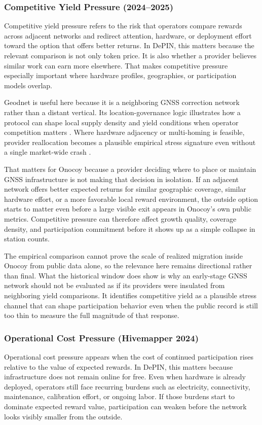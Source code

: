 \subsubsection*{Competitive Yield Pressure (2024--2025)}
Competitive yield pressure refers to the risk that operators compare rewards across adjacent networks and redirect attention, hardware, or deployment effort toward the option that offers better returns. In DePIN, this matters because the relevant comparison is not only token price. It is also whether a provider believes similar work can earn more elsewhere. That makes competitive pressure especially important where hardware profiles, geographies, or participation models overlap.

Geodnet is useful here because it is a neighboring GNSS correction network rather than a distant vertical. Its location-governance logic illustrates how a protocol can shape local supply density and yield conditions when operator competition matters \cite{GeodnetLocationNFT}. Where hardware adjacency or multi-homing is feasible, provider reallocation becomes a plausible empirical stress signature even without a single market-wide crash \cite{Lin2024, Chiu2024}.

That matters for Onocoy because a provider deciding where to place or maintain GNSS infrastructure is not making that decision in isolation. If an adjacent network offers better expected returns for similar geographic coverage, similar hardware effort, or a more favorable local reward environment, the outside option starts to matter even before a large visible exit appears in Onocoy's own public metrics. Competitive pressure can therefore affect growth quality, coverage density, and participation commitment before it shows up as a simple collapse in station counts.

The empirical comparison cannot prove the scale of realized migration inside Onocoy from public data alone, so the relevance here remains directional rather than final. What the historical window does show is why an early-stage GNSS network should not be evaluated as if its providers were insulated from neighboring yield comparisons. It identifies competitive yield as a plausible stress channel that can shape participation behavior even when the public record is still too thin to measure the full magnitude of that response.

\subsubsection*{Operational Cost Pressure (Hivemapper 2024)}
Operational cost pressure appears when the cost of continued participation rises relative to the value of expected rewards. In DePIN, this matters because infrastructure does not remain online for free. Even when hardware is already deployed, operators still face recurring burdens such as electricity, connectivity, maintenance, calibration effort, or ongoing labor. If those burdens start to dominate expected reward value, participation can weaken before the network looks visibly smaller from the outside.

